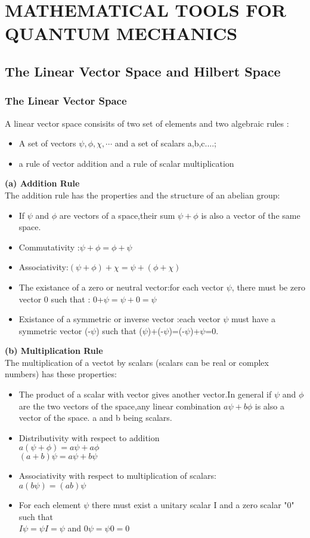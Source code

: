 \chapter{MATHEMATICAL TOOLS FOR QUANTUM MECHANICS}
\section{The Linear Vector Space and Hilbert Space}
\subsection{The Linear Vector Space}
A linear vector space consisits of two set of elements and two algebraic rules :
\begin{itemize}
	\item A set of vectors $\psi,\phi,\chi, \cdots $ and a set of scalars a,b,c....;
	\item a rule of vector addition and a rule of scalar multiplication
\end{itemize}
\textbf{(a) Addition Rule}\\
The addition rule has the properties and the structure of an abelian group:
\begin{itemize}
	\item If $\psi$ and $\phi$ are vectors of a space,their sum $\psi+\phi$ is also a vector of the same space.
	\item Commutativity :$\psi+\phi=\phi+\psi$
	\item Associativity:$(\psi+\phi)+\chi=\psi+(\phi+\chi)$
	\item The existance of a zero or neutral vector:for each vector $\psi$, there must be zero vector 0 such that : 0+$\psi=\psi+0=\psi$
	\item Existance of a symmetric or inverse vector :each vector $\psi$ must have a symmetric vector (-$\psi$) such that ($\psi$)+(-$\psi$)=(-$\psi$)+$\psi$=0.
\end{itemize}
\textbf{(b) Multiplication Rule}\\
The multiplication of a vectot by scalars (scalars can be real or complex numbers) has these properties:
\begin{itemize}
	\item The product of a scalar with vector gives another vector.In general if $\psi$ and $\phi$ are the two vectors of the space,any linear combination $a\psi+b\phi$ is also a vector of the space. a and b being scalars.
	\item Distributivity with respect to addition\\
	$a(\psi+\phi)=a\psi+a\phi$\\
	$(a+b)\psi=a\psi+b\psi$
	\item Associativity with respect to multiplication of scalars:\\
	$a(b\psi)=(ab)\psi$
	\item For each element $\psi$ there must exist a unitary scalar I and a zero scalar "0" such that \\
	$I\psi=\psi I =\psi$ and $0\psi=\psi0=0$
\end{itemize}
